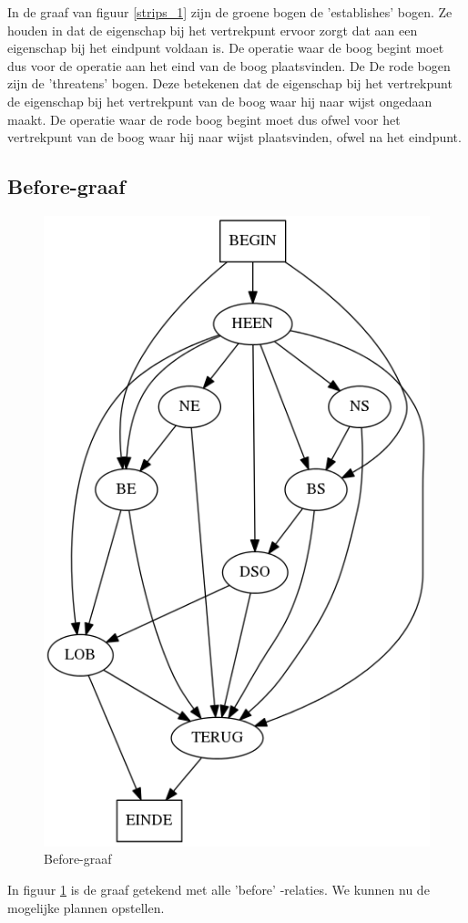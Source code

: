 \documentclass[alternative-exam.tex]{subfiles}
\begin{document}
In de graaf van figuur \ref{strips_1} zijn de groene bogen de 'establishes' bogen. Ze houden in dat de eigenschap bij het vertrekpunt ervoor zorgt dat aan een eigenschap bij het eindpunt voldaan is. De operatie waar de boog begint moet dus voor de operatie aan het eind van de boog plaatsvinden.
De De rode bogen zijn de 'threatens' bogen. Deze betekenen dat de eigenschap bij het vertrekpunt de eigenschap bij het vertrekpunt van de boog waar hij naar wijst ongedaan maakt. De operatie waar de rode boog begint moet dus ofwel voor het vertrekpunt van de boog waar hij naar wijst plaatsvinden, ofwel na het eindpunt.
\subsection{Before-graaf}
\begin{figure}[H]
\centering
\caption{Before-graaf}
\label{strips_2}
\includegraphics[scale=0.3]{resources/graphs/strips_2.png}
\end{figure}
In figuur \ref{strips_2} is de graaf getekend met alle 'before'
-relaties. We kunnen nu de mogelijke plannen opstellen. 
\end{document}
